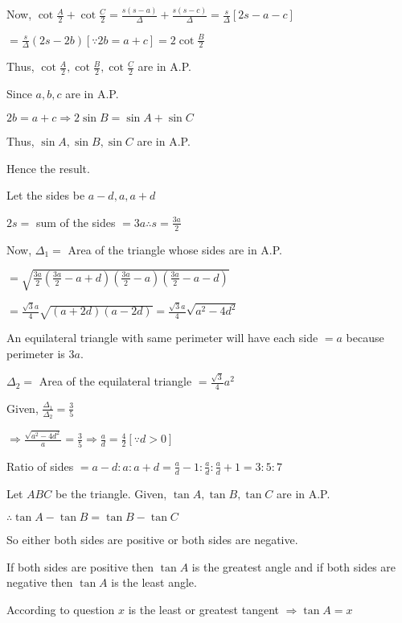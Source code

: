   Now, $\cot \frac{A}{2} + \cot \frac{C}{2} = \frac{s(s - a)}{\Delta} + \frac{s(s - c)}{\Delta} = \frac{s}{\Delta}[2s -
    a - c]$

  $= \frac{s}{\Delta}(2s - 2b)[\because 2b = a + c] = 2\cot \frac{B}{2}$

  Thus, $\cot \frac{A}{2}, \cot \frac{B}{2}, \cot \frac{C}{2}$ are in A.P.

  Since $a, b, c$ are in A.P.

  $2b = a + c \Rightarrow 2\sin B = \sin A + \sin C$

  Thus, $\sin A, \sin B, \sin C$ are in A.P.

  Hence the result.

\item Let the sides be $a - d, a, a + d$

  $2s =$ sum of the sides $= 3a \therefore s = \frac{3a}{2}$

  Now, $\Delta_1 =$ Area of the triangle whose sides are in A.P.

  $= \sqrt{\frac{3a}{2}\left(\frac{3a}{2} - a + d\right)\left(\frac{3a}{2} - a\right)\left(\frac{3a}{2}- a- d\right)}$

  $= \frac{\sqrt{3}a}{4}\sqrt{(a + 2d)(a - 2d)} = \frac{\sqrt{3}a}{4}\sqrt{a^2 - 4d^2}$

  An equilateral triangle with same perimeter will have each side $= a$ because perimeter is $3a.$

  $\Delta_2 =$ Area of the equilateral triangle $= \frac{\sqrt{3}}{4}a^2$

  Given, $\frac{\Delta_1}{\Delta_2} = \frac{3}{5}$

  $\Rightarrow \frac{\sqrt{a^2 - 4d^2}}{a} = \frac{3}{5} \Rightarrow \frac{a}{d} = \frac{4}{2}[\because d > 0]$

  Ratio of sides $= a - d: a: a + d = \frac{a}{d} - 1:\frac{a}{d}:\frac{a}{d}+1 = 3:5:7$

\item Let $ABC$ be the triangle. Given, $\tan A, \tan B, \tan C$ are in A.P.

  $\therefore \tan A - \tan B = \tan B - \tan C$

  So either both sides are positive or both sides are negative.

  If both sides are positive then $\tan A$ is the greatest angle and if both sides are negative then $\tan A$ is the
  least angle.

  According to question $x$ is the least or greatest tangent $\Rightarrow \tan A = x$


